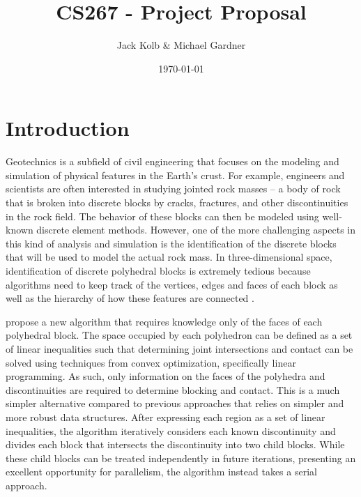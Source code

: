\documentclass[american]{article}
\begin{document}
\title{\vspace{-3em}CS267 - Project Proposal}
\author{Jack Kolb \& Michael Gardner}
\date{\today}
\maketitle
\vspace{-4em}

\section{Introduction}
Geotechnics is a subfield of civil engineering that focuses on the modeling and simulation of physical features in the Earth's crust. For example, engineers and scientists are often interested in studying jointed rock masses -- a body of rock that is broken into discrete blocks by cracks, fractures, and other discontinuities in the rock field. The behavior of these blocks can then be modeled using well-known discrete element methods. However, one of the more challenging aspects in this kind of analysis and simulation is the identification of the discrete blocks that will be used to model the actual rock mass. In three-dimensional space, identification of discrete polyhedral blocks is extremely tedious because algorithms need to keep track of the vertices, edges and faces of each block as well as the hierarchy of how these features are connected \parencite{Collision}.

\textcite{Collision} propose a new algorithm that requires knowledge only of the faces of each polyhedral block. The space occupied by each polyhedron can be defined as a set of linear inequalities such that determining joint intersections and contact can be solved using techniques from convex optimization, specifically linear programming. As such, only information on the faces of the polyhedra and discontinuities are required to determine blocking and contact. This is a much simpler alternative compared to previous approaches that relies on simpler and more robust data structures. After expressing each region as a set of linear inequalities, the algorithm iteratively considers each known discontinuity and divides each block that intersects the discontinuity into two child blocks. While these child blocks can be treated independently in future iterations, presenting an excellent opportunity for parallelism, the algorithm instead takes a serial approach.
\end{document}
